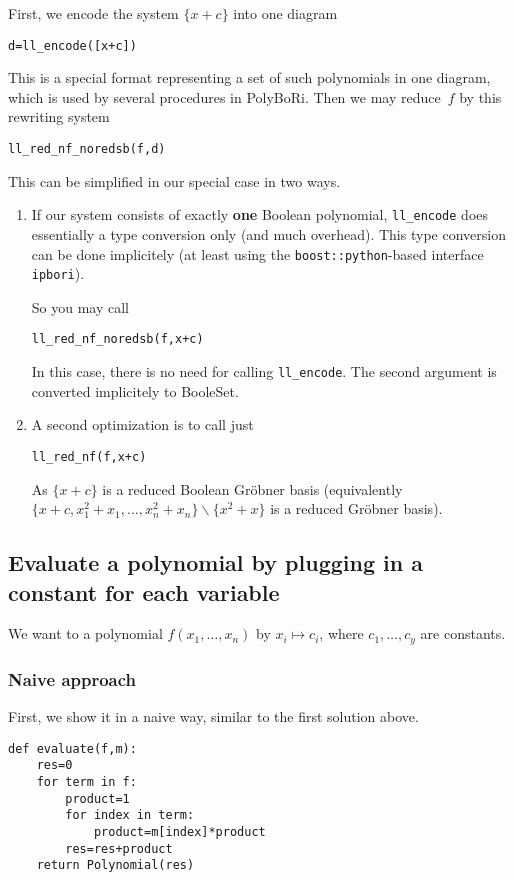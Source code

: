 \documentclass[]{article}
\newcommand{\PolyBoRi}{{\sc PolyBoRi}\xspace}
\newcommand{\Groebner}{Gr\"{o}bner\xspace}
\newcommand{\explfieldequations}{{x_1^2+x_1,\ldots,x_n^2+x_n}}
\begin{document}
First, we encode the system $\{x+c\}$ into one diagram
\begin{verbatim}
d=ll_encode([x+c])    
\end{verbatim}
%
This is a special format representing a set of such polynomials in one diagram, which is used by several procedures in
\PolyBoRi.
Then we may
reduce~$f$ by this rewriting system
\begin{verbatim}
ll_red_nf_noredsb(f,d)  
\end{verbatim}
%
%
This can be simplified in our special case in two ways.
\begin{enumerate}
    \item If our system consists of exactly \textbf{one} Boolean polynomial,
    \verb|ll_encode| does essentially  a type conversion only (and much overhead).
    This type conversion can be done implicitely (at least using the
\verb|boost::python|-based  interface \verb|ipbori|).

    So you may call
\begin{verbatim}
ll_red_nf_noredsb(f,x+c)  
\end{verbatim}
%
    In this case, there is no need for calling \verb|ll_encode|.
    The second argument is converted implicitely to BooleSet.
    \item A second optimization is to call just
\begin{verbatim}
ll_red_nf(f,x+c)
\end{verbatim}
    As $\{x+c\}$ is a reduced Boolean \Groebner basis (equivalently $\{x+c,\explfieldequations\}\backslash \{x^2+x\}$ is a reduced 
\Groebner 
basis).
\end{enumerate}



\subsection{Evaluate a polynomial by plugging in a constant for each variable}
    We want to a polynomial
    $f(x_1,\ldots, x_n)$
    by
    $x_i\mapsto c_i$, where
    $c_1,\ldots, c_y$ are constants.

\subsubsection{Naive approach}
First, we show it in a naive way, similar to the first solution above.

\begin{verbatim}
def evaluate(f,m):
    res=0
    for term in f:
        product=1
        for index in term:
            product=m[index]*product
        res=res+product
    return Polynomial(res)
\end{verbatim}
\end{document}
